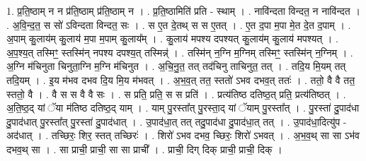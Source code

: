 \documentclass[17pt]{extarticle}
\begin{document}
1. प्र॒ति॒ष्ठाम् न न प्र॑ति॒ष्ठाम् प्र॑ति॒ष्ठाम् न । . प्र॒ति॒ष्ठामिति॑ प्रति - स्थाम् । . नावि॑न्दता विन्दत॒ न नावि॑न्दत । . अ॒वि॒न्द॒त॒ स सो॑ ऽविन्दता विन्दत॒ सः । . स ए॒त दे॒तथ् स स ए॒तत् । . ए॒त द॒पा म॒पा मे॒त दे॒त द॒पाम् । . अ॒पाम् कु॒लाय॑म् कु॒लाय॑ म॒पा म॒पाम् कु॒लाय᳚म् । . कु॒लाय॑ मपश्य दपश्यत् कु॒लाय॑म् कु॒लाय॑ मपश्यत् । . अ॒प॒श्य॒त् तस्मिꣳ॒॒ स्तस्मि॑न् नपश्य दपश्य॒त् तस्मिन्न्॑ । . तस्मि॑न् न॒ग्नि म॒ग्निम् तस्मिꣳ॒॒ स्तस्मि॑न् न॒ग्निम् । . अ॒ग्नि म॑चिनुता चिनुता॒ग्नि म॒ग्नि म॑चिनुत । . अ॒चि॒नु॒त॒ तत् तद॑चिनु ताचिनुत॒ तत् । . तदि॒य मि॒यम् तत् तदि॒यम् । . इ॒य म॑भव दभव दि॒य मि॒य म॑भवत् । . अ॒भ॒व॒त् तत॒ स्ततो॑ ऽभव दभव॒त् ततः॑ । . ततो॒ वै वै तत॒ स्ततो॒ वै । . वै स स वै वै सः । . स प्रति॒ प्रति॒ स स प्रति॑ । . प्रत्य॑तिष्ठ दतिष्ठ॒त् प्रति॒ प्रत्य॑तिष्ठत् । . अ॒ति॒ष्ठ॒द् यां ॅया म॑तिष्ठ दतिष्ठ॒द् याम् । . याम् पु॒रस्ता᳚त् पु॒रस्ता॒द् यां ॅयाम् पु॒रस्ता᳚त् । . पु॒रस्ता॑ दु॒पाद॑धा दु॒पाद॑धात् पु॒रस्ता᳚त् पु॒रस्ता॑ दु॒पाद॑धात् । . उ॒पाद॑धा॒त् तत् तदु॒पाद॑धा दु॒पाद॑धा॒त् तत् । . उ॒पाद॑धा॒दित्यु॑प - अद॑धात् । . तच्छिरः॒ शिर॒ स्तत् तच्छिरः॑ । . शिरो॑ ऽभव दभव॒ च्छिरः॒ शिरो॑ ऽभवत् । . अ॒भ॒व॒थ् सा सा ऽभ॑व दभव॒थ् सा । . सा प्राची॒ प्राची॒ सा सा प्राची᳚ । . प्राची॒ दिग् दिक् प्राची॒ प्राची॒ दिक् । \newline
\end{document}
